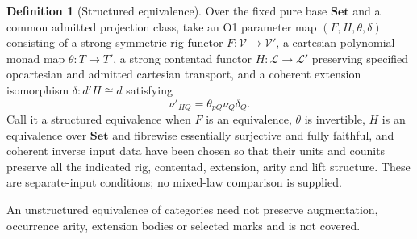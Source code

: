 \documentclass[11pt,a4paper]{article}
\theoremstyle{definition}
\newtheorem{definition}[theorem]{Definition}
\newcommand{\Set}{\mathbf{Set}}
\newcommand{\V}{\mathcal V}
\newcommand{\Lcat}{\mathcal L}
\begin{document}
\begin{definition}[Structured equivalence]\label{def:structured-equivalence}
Over the fixed pure base $\Set$ and a common admitted projection class, take
an O1 parameter map $(F,H,\theta,\delta)$ consisting of a strong
symmetric-rig functor $F:\V\to\V'$, a cartesian polynomial-monad map
$\theta:T\to T'$, a strong contentad functor $H:\Lcat\to\Lcat'$ preserving
specified opcartesian and admitted cartesian transport, and a coherent
extension isomorphism $\delta:d'H\cong d$ satisfying
\[
 \nu'_{HQ}=\theta_{pQ}\nu_Q\delta_Q.
\]
Call it a structured equivalence when $F$ is an equivalence, $\theta$ is
invertible, $H$ is an equivalence over $\Set$ and fibrewise essentially
surjective and fully faithful, and coherent inverse input data have been
chosen so that their units and counits preserve all the indicated rig,
contentad, extension, arity and lift structure.
These are separate-input conditions; no mixed-law comparison is supplied.
\end{definition}
An unstructured equivalence of categories need not preserve augmentation,
occurrence arity, extension bodies or selected marks and is not covered.
\end{document}
